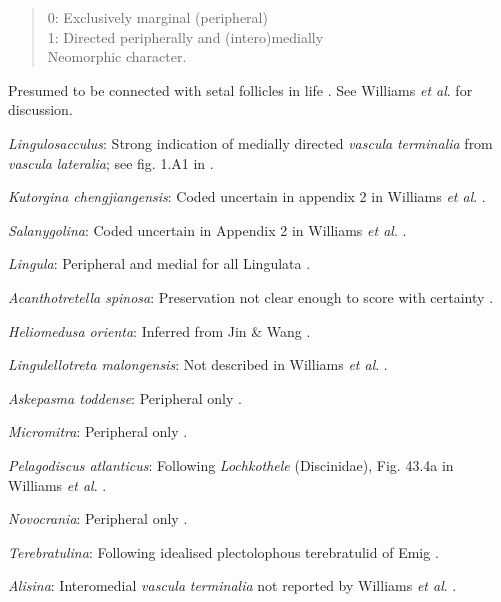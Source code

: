 \documentclass[]{book}
\theoremstyle{definition}
\theoremstyle{definition}
\theoremstyle{definition}
\theoremstyle{remark}
\begin{document}
\begin{quote}
0: Exclusively marginal (peripheral)\\
1: Directed peripherally and (intero)medially\\
Neomorphic character.
\end{quote}

Presumed to be connected with setal follicles in life
\citep{Williams1998Thediversity}. See Williams \emph{et al}.
\citeyearpar{Williams2000BrachiopodaLinguliformea} for discussion.

\emph{Lingulosacculus}: Strong indication of medially directed
\emph{vascula} \emph{terminalia} from \emph{vascula} \emph{lateralia};
see fig. 1.A1 in \citet{Balthasar2009EarlyCambrian}.

\emph{Kutorgina chengjiangensis}: Coded uncertain in appendix 2 in
Williams \emph{et al}. \citeyearpar{Williams1998Thediversity}.

\emph{Salanygolina}: Coded uncertain in Appendix 2 in Williams \emph{et
al}. \citeyearpar{Williams1998Thediversity}.

\emph{Lingula}: Peripheral and medial for all Lingulata
\citep{Williams2000BrachiopodaLinguliformea}.

\emph{Acanthotretella spinosa}: Preservation not clear enough to score
with certainty \citep{Holmer2006Aspinose}.

\emph{Heliomedusa orienta}: Inferred from Jin \& Wang
\citeyearpar{Jin1992Revisionof}.

\emph{Lingulellotreta malongensis}: Not described in Williams \emph{et
al}. \citeyearpar{Williams2000BrachiopodaLinguliformea}.

\emph{Askepasma toddense}: Peripheral only
\citep{Williams1998Thediversity, Williams2000BrachiopodaLinguliformea}.

\emph{Micromitra}: Peripheral only
\citep{Williams1998Thediversity, Williams2000BrachiopodaLinguliformea}.

\emph{Pelagodiscus atlanticus}: Following \emph{Lochkothele}
(Discinidae), Fig. 43.4a in Williams \emph{et al}.
\citeyearpar{Williams2000BrachiopodaLinguliformea}.

\emph{Novocrania}: Peripheral only
\citep[p.158]{Williams2000BrachiopodaLinguliformea}.

\emph{Terebratulina}: Following idealised plectolophous terebratulid of
Emig \citeyearpar{Emig1992Functionaldisposition}.

\emph{Alisina}: Interomedial \emph{vascula} \emph{terminalia} not
reported by Williams \emph{et al}.
\citeyearpar{Williams2000BrachiopodaLinguliformea}.
\end{document}
